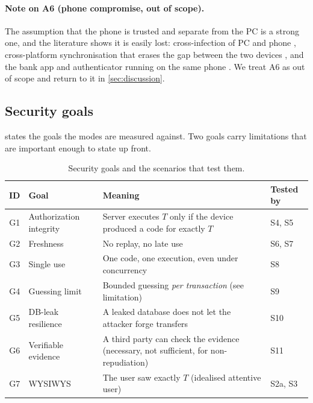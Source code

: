 \paragraph{Note on A6 (phone compromise, out of scope).}
The assumption that the phone is trusted and separate from the PC is a strong
one, and the literature shows it is easily lost: cross-infection of PC and phone
\cite{dmitrienko2014}, cross-platform synchronisation that erases the gap between
the two devices \cite{konoth2016}, and the bank app and authenticator running on
the same phone \cite{haupert2018}. We treat A6 as out of scope and return to it
in \cref{sec:discussion}.

\subsection{Security goals}
 states the goals the modes are measured against. Two goals carry
limitations that are important enough to state up front.

\begin{table}[htbp]
\centering
\caption{Security goals and the scenarios that test them.}
\label{tab:goals}
\small
\begin{tabularx}{\linewidth}{@{}clX l@{}}
\toprule
ID & Goal & Meaning & Tested by \\
\midrule
G1 & Authorization integrity & Server executes $T$ only if the device produced a code for exactly $T$ & S4, S5 \\
G2 & Freshness               & No replay, no late use & S6, S7 \\
G3 & Single use              & One code, one execution, even under concurrency & S8 \\
G4 & Guessing limit          & Bounded guessing \emph{per transaction} (see limitation) & S9 \\
G5 & DB-leak resilience      & A leaked database does not let the attacker forge transfers & S10 \\
G6 & Verifiable evidence     & A third party can check the evidence (necessary, not sufficient, for non-repudiation) & S11 \\
G7 & WYSIWYS                 & The user saw exactly $T$ (idealised attentive user) & S2a, S3 \\
\bottomrule
\end{tabularx}
\end{table}

